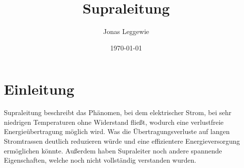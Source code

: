 \documentclass[a4paper]{scrartcl}
\title{Supraleitung}
\author{Jonas Leggewie}
\date{\today}
\begin{document}
\maketitle
\newpage
\tableofcontents
\newpage


\section{Einleitung}
Supraleitung beschreibt das Phänomen, bei dem elektrischer Strom, bei sehr niedrigen Temperaturen 
ohne Widerstand fließt, wodurch eine verlustfreie Energieübertragung möglich wird. Was die 
Übertragungsverluste auf langen Stromtrassen deutlich reduzieren würde und eine effizientere 
Energieversorgung ermöglichen könnte. Außerdem haben Supraleiter noch andere spannende 
Eigenschaften, welche noch nicht vollständig verstanden wurden. 




\newpage









\newpage

\end{document}
